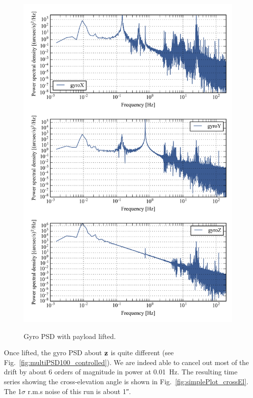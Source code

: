 \begin{figure}[!h]
\begin{center}
\includegraphics{Figures/lifted_400.png}
\label{fig:multiPSD400_lifted}
\vspace{-0.5cm}
\caption[Gyro PSD with payload lifted]{Gyro PSD with payload lifted.}
\end{center}
\end{figure}


Once lifted, the gyro PSD about $\textrm{\textbf{z}}$ is quite different (see Fig.~\ref{fig:multiPSD100_controlled}). We are indeed able to cancel out most of the drift by about 6 orders of magnitude in power at \SI{0.01}{\hertz}. The resulting time series showing the cross-elevation angle is shown in Fig.~\ref{fig:simplePlot_crossEl}. The 1$\sigma$ r.m.s noise of this run is about \ang{;;1}.

